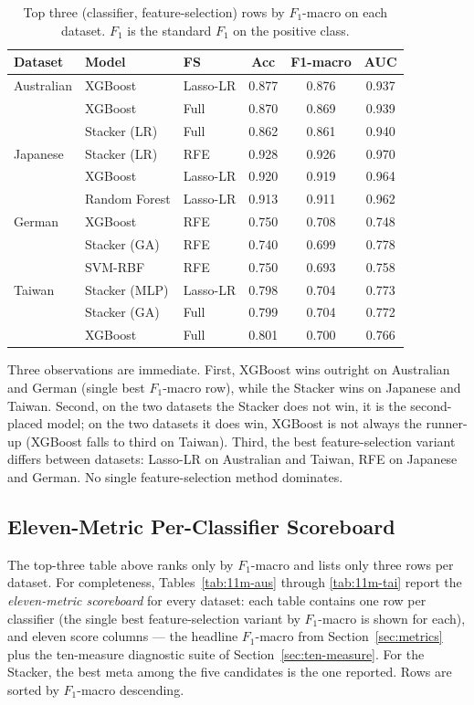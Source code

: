\begin{table}[H]
\centering
\caption{Top three (classifier, feature-selection) rows by
$F_1$-macro on each dataset. $F_1$ is the standard $F_1$ on the
positive class.}
\singlespacing
\label{tab:per-dataset}
\small
\renewcommand{\arraystretch}{1.15}
\begin{tabular}{l l l c c c}
\toprule
\textbf{Dataset} & \textbf{Model} & \textbf{FS} & \textbf{Acc} & \textbf{F1-macro} & \textbf{AUC}\\
\midrule
Australian & XGBoost & Lasso-LR & 0.877 & 0.876 & 0.937\\
 & XGBoost & Full & 0.870 & 0.869 & 0.939\\
 & Stacker (LR) & Full & 0.862 & 0.861 & 0.940\\
\midrule
Japanese & Stacker (LR) & RFE & 0.928 & 0.926 & 0.970\\
 & XGBoost & Lasso-LR & 0.920 & 0.919 & 0.964\\
 & Random Forest & Lasso-LR & 0.913 & 0.911 & 0.962\\
\midrule
German & XGBoost & RFE & 0.750 & 0.708 & 0.748\\
 & Stacker (GA) & RFE & 0.740 & 0.699 & 0.778\\
 & SVM-RBF & RFE & 0.750 & 0.693 & 0.758\\
\midrule
Taiwan & Stacker (MLP) & Lasso-LR & 0.798 & 0.704 & 0.773\\
 & Stacker (GA) & Full & 0.799 & 0.704 & 0.772\\
 & XGBoost & Full & 0.801 & 0.700 & 0.766\\
\bottomrule
\end{tabular}
\end{table}
Three observations are immediate. First, XGBoost wins outright on
Australian and German (single best $F_1$-macro row), while the
Stacker wins on Japanese and Taiwan. Second, on the two datasets
the Stacker does not win, it is the second-placed model; on the
two datasets it does win, XGBoost is not always the runner-up
(XGBoost falls to third on Taiwan). Third, the best
feature-selection variant differs between datasets: Lasso-LR on
Australian and Taiwan, RFE on Japanese and German. No single
feature-selection method dominates.

\subsection{Eleven-Metric Per-Classifier Scoreboard}
\label{sec:eleven-metric}

The top-three table above ranks only by $F_1$-macro and lists only
three rows per dataset. For completeness, Tables~\ref{tab:11m-aus}
through \ref{tab:11m-tai} report the \emph{eleven-metric scoreboard}
for every dataset: each table contains one row per classifier (the
single best feature-selection variant by $F_1$-macro is shown for
each), and eleven score columns --- the headline $F_1$-macro from
Section~\ref{sec:metrics} plus the ten-measure diagnostic suite of
Section~\ref{sec:ten-measure}. For the Stacker, the best meta among
the five candidates is the one reported. Rows are sorted by
$F_1$-macro descending.

